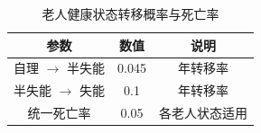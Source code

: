 \begin{table}[h]
\centering
\caption{老人健康状态转移概率与死亡率}
\begin{tabular}{|c|c|c|}
\hline
参数 & 数值 & 说明 \\
\hline
自理 $\rightarrow$ 半失能 & 0.045 & 年转移率 \\
半失能 $\rightarrow$ 失能 & 0.1 & 年转移率 \\
统一死亡率 & 0.05 & 各老人状态适用 \\
\hline
\end{tabular}
\end{table}